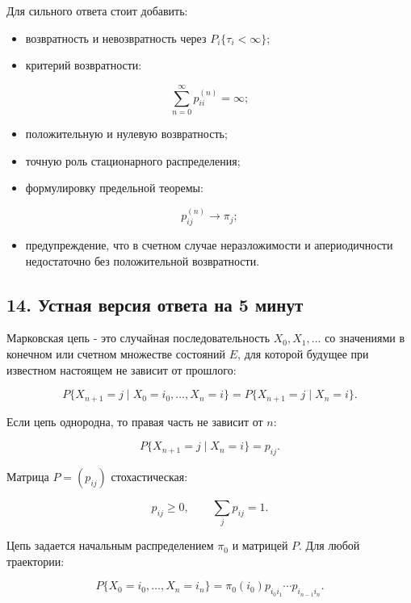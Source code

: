 \documentclass[
  11pt,
  a4paper,
]{article}
\providecommand{\tightlist}{%
  \setlength{\itemsep}{0pt}\setlength{\parskip}{0pt}}
\begin{document}
Для сильного ответа стоит добавить:

\begin{itemize}
\tightlist
\item
  возвратность и невозвратность через \(P_i\{\tau_i<\infty\}\);
\item
  критерий возвратности:
\end{itemize}

\[
\sum_{n=0}^{\infty}p_{ii}^{(n)}=\infty;
\]

\begin{itemize}
\tightlist
\item
  положительную и нулевую возвратность;
\item
  точную роль стационарного распределения;
\item
  формулировку предельной теоремы:
\end{itemize}

\[
p_{ij}^{(n)}\to\pi_j;
\]

\begin{itemize}
\tightlist
\item
  предупреждение, что в счетном случае неразложимости и апериодичности
  недостаточно без положительной возвратности.
\end{itemize}

\subsection{14. Устная версия ответа на 5
минут}\label{ux443ux441ux442ux43dux430ux44f-ux432ux435ux440ux441ux438ux44f-ux43eux442ux432ux435ux442ux430-ux43dux430-5-ux43cux438ux43dux443ux442}

Марковская цепь - это случайная последовательность \(X_0,X_1,\ldots\) со
значениями в конечном или счетном множестве состояний \(E\), для которой
будущее при известном настоящем не зависит от прошлого:

\[
P\{X_{n+1}=j\mid X_0=i_0,\ldots,X_n=i\}
=
P\{X_{n+1}=j\mid X_n=i\}.
\]

Если цепь однородна, то правая часть не зависит от \(n\):

\[
P\{X_{n+1}=j\mid X_n=i\}=p_{ij}.
\]

Матрица \(P=(p_{ij})\) стохастическая:

\[
p_{ij}\ge0,
\qquad
\sum_jp_{ij}=1.
\]

Цепь задается начальным распределением \(\pi_0\) и матрицей \(P\). Для
любой траектории:

\[
P\{X_0=i_0,\ldots,X_n=i_n\}
=
\pi_0(i_0)p_{i_0i_1}\cdots p_{i_{n-1}i_n}.
\]
\end{document}
